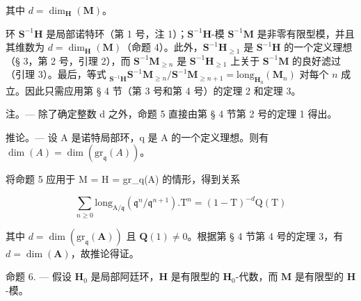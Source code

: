 其中 \(d = \dim_{\mathbf{H}}(\mathbf{M})\)。

环 \(\mathbf{S}^{-1}\mathbf{H}\) 是局部诺特环（第 1 号，注 1）；\(\mathbf{S}^{-1}\mathbf{H}\)-模 \(\mathbf{S}^{-1}\mathbf{M}\) 是非零有限型模，并且其维数为 \(d = \dim_{\mathbf{H}}(\mathbf{M})\)（命题 4）。此外，\(\mathbf{S}^{-1}\mathbf{H}_{\geqslant 1}\) 是 \(\mathbf{S}^{-1}\mathbf{H}\) 的一个定义理想（§ 3，第 2 号，引理 2），而 \(\mathbf{S}^{-1}\mathbf{M}_{\geqslant n}\) 是 \(\mathbf{S}^{-1}\mathbf{H}_{\geqslant 1}\) 上关于 \(\mathbf{S}^{-1}\mathbf{M}\) 的良好滤过（引理 3）。最后，等式 \(_{\mathbf{S}^{-1}\mathbf{H}}\mathbf{S}^{-1}\mathbf{M}_{\geqslant n}/\mathbf{S}^{-1}\mathbf{M}_{\geqslant n+1} = \text{long}_{\mathbf{H}_0}(\mathbf{M}_n)\) 对每个 \(n\) 成立。因此只需应用第 § 4 节（第 3 号和第 4 号）的定理 2 和定理 3。

注。--- 除了确定整数 d 之外，命题 5 直接由第 § 4 节第 2 号的定理 1 得出。

推论。--- 设 A 是诺特局部环，q 是 A 的一个定义理想。则有 \(\dim(A) = \dim(\text{gr}_{\mathfrak{q}}(A))\)。

将命题 5 应用于 M = H = gr\_q(A) 的情形，得到关系

\[
\sum_ {n \geqslant 0} \mathrm{long} _ {\mathrm{A} / \mathfrak {q}} (\mathfrak {q} ^ {n} / \mathfrak {q} ^ {n + 1}). \mathrm{T} ^ {n} = (1 - \mathrm{T}) ^ {- d} \mathrm{Q} (\mathrm{T})
\]

其中 \(d = \dim(\mathrm{gr}_{\mathfrak{q}}(\mathbf{A}))\) 且 \(\mathbf{Q}(1) \neq 0\)。根据第 § 4 节第 4 号的定理 3，有 \(d = \dim(\mathbf{A})\)，故推论得证。

命题 6. --- 假设 \(\mathbf{H}_{0}\) 是局部阿廷环，\(\mathbf{H}\) 是有限型的 \(\mathbf{H}_{0}\)-代数，而 \(\mathbf{M}\) 是有限型的 \(\mathbf{H}\)-模。

